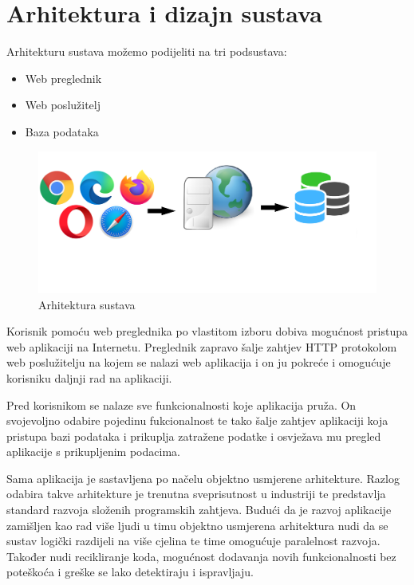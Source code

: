 \chapter{Arhitektura i dizajn sustava}
		
	

		
		Arhitekturu sustava možemo podijeliti na tri podsustava:
		\begin{itemize}
			\item Web preglednik
			\item Web poslužitelj
			\item Baza podataka
		\end{itemize}
	
		
		\begin{figure}[H]
			\includegraphics[scale=0.35]{slike/arhitektura.png} %
			\centering
			\caption {Arhitektura sustava}
			\label{fig:promjene}
		\end{figure}
		
		Korisnik pomoću web preglednika po vlastitom izboru dobiva mogućnost  pristupa web aplikaciji na  Internetu. Preglednik zapravo šalje zahtjev HTTP protokolom web poslužitelju na kojem se nalazi web aplikacija i on ju pokreće i omogućuje korisniku daljnji rad na aplikaciji.
		
		Pred korisnikom se nalaze sve funkcionalnosti koje aplikacija pruža. On svojevoljno odabire pojedinu fukcionalnost te tako šalje zahtjev aplikaciji koja pristupa bazi podataka i prikuplja zatražene podatke i osvježava mu pregled aplikacije s prikupljenim podacima. 

		Sama aplikacija je sastavljena po načelu objektno usmjerene arhitekture. Razlog odabira takve arhitekture je trenutna sveprisutnost u industriji te predstavlja standard razvoja složenih programskih zahtjeva. Budući da je razvoj aplikacije zamišljen kao rad više ljudi u timu  objektno usmjerena arhitektura nudi da se sustav logički razdijeli na više cjelina te time omogućuje paralelnost razvoja.
		Također nudi recikliranje koda, mogućnost dodavanja novih funkcionalnosti bez poteškoća i greške se lako detektiraju i ispravljaju.
		
